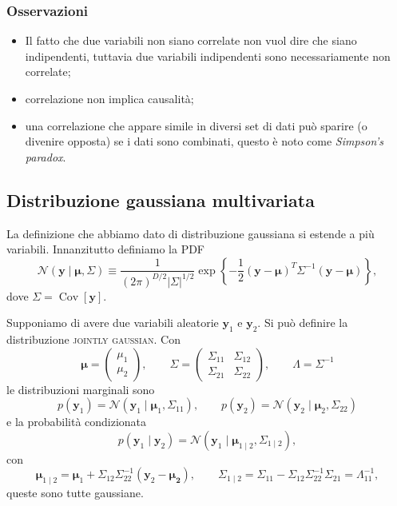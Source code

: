 \documentclass[10pt]{article}
\DeclareMathOperator{\Cov}{Cov}
\renewcommand{\vec}[1]{\boldsymbol{#1}}
\newcommand{\im}[1]{\textsc{#1}}
\newcommand{\cond}{\mid}
\newcommand{\pare}[1]{
	\ensuremath{\left(#1\right)}
}
\newcommand{\spare}[1]{
	\ensuremath{\left[#1\right]}
}
\theoremstyle{definition}
\begin{document}
\subsubsection{Osservazioni}
\begin{itemize}
\item Il fatto che due variabili non siano correlate non vuol dire che siano indipendenti, tuttavia due variabili indipendenti sono necessariamente non correlate;
\item correlazione non implica causalità;
\item una correlazione che appare simile in diversi set di dati può sparire (o divenire opposta) se i dati sono combinati, questo è noto come \textit{Simpson's paradox}.
\end{itemize}

\subsection{Distribuzione gaussiana multivariata}
La definizione che abbiamo dato di distribuzione gaussiana si estende a più variabili. Innanzitutto definiamo la PDF
\begin{equation}
\mathcal{N}\pare{\vec{y}\cond\vec{\mu}, \Sigma} \equiv \frac{1}{\pare{2\pi}^{D/2}\left|\Sigma\right|^{1/2}}\exp\left\{-\frac{1}{2}\pare{\vec{y}-\vec{\mu}}^T\Sigma^{-1}\pare{\vec{y}-\vec{\mu}}\right\},
\end{equation}
dove $\Sigma = \Cov\spare{\vec{y}}$.

Supponiamo di avere due variabili aleatorie $\vec{y}_1$ e $\vec{y}_2$. Si può definire la distribuzione \im{jointly gaussian}. Con
\[
\vec{\mu} = \pare{\begin{array}{c}
\mu_1 \\
\mu_2
\end{array}},\qquad
\Sigma = \pare{\begin{array}{cc}
\Sigma_{11} & \Sigma_{12} \\
\Sigma_{21} & \Sigma_{22}
\end{array}},\qquad
\Lambda = \Sigma^{-1}
\]
le distribuzioni marginali sono
\begin{equation}
p\pare{\vec{y}_1} = \mathcal{N}\pare{\vec{y}_1\cond\vec{\mu}_1, \Sigma_{11}},\qquad p\pare{\vec{y}_2} = \mathcal{N}\pare{\vec{y}_2\cond\vec{\mu}_2, \Sigma_{22}}
\end{equation}
e la probabilità condizionata
\begin{equation}
p\pare{\vec{y}_1\cond\vec{y}_2} = \mathcal{N}\pare{\vec{y}_1\cond\vec{\mu}_{1\cond 2}, \Sigma_{1\cond 2}},
\end{equation}
con
\[
\vec{\mu}_{1\cond 2} = \vec{\mu}_1 + \Sigma_{12}\Sigma_{22}^{-1}\pare{\vec{y}_2 - \vec{\mu_2}},\qquad \Sigma_{1\cond 2} = \Sigma_{11} - \Sigma_{12}\Sigma_{22}^{-1}\Sigma_{21}=\Lambda_{11}^{-1},
\]
queste sono tutte gaussiane.
\end{document}
